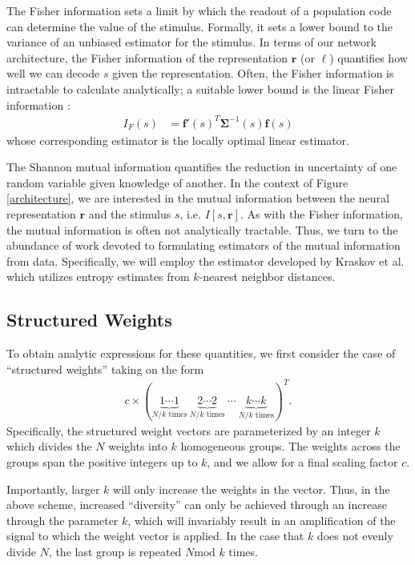 \documentclass[12pt]{article}
\begin{document}
The Fisher information sets a limit by which the readout of a population code can determine the value of the stimulus. Formally, it sets a lower bound to the variance of an unbiased estimator for the stimulus. In terms of our network architecture, the Fisher information of the representation $\mathbf{r}$ (or $\boldsymbol{\ell}$) quantifies how well we can decode $s$ given the representation. Often, the Fisher information is intractable to calculate analytically; a suitable lower bound is the linear Fisher information \citep{kohn2016}:
\begin{align}
I_F(s) &= \mathbf{f}'(s)^T \boldsymbol{\Sigma}^{-1}(s) \mathbf{f}(s)
\end{align}
whose corresponding estimator is the locally optimal linear estimator. 

The Shannon mutual information quantifies the reduction in uncertainty of one random variable given knowledge of another. In the context of Figure \ref{architecture}, we are interested in the mutual information between the neural representation $\mathbf{r}$ and the stimulus $s$, i.e. $I[s, \mathbf{r}]$. As with the Fisher information, the mutual information is often not analytically tractable. Thus, we turn to the abundance of work devoted to formulating estimators of the mutual information from data. Specifically, we will employ the estimator developed by Kraskov et al. which utilizes entropy estimates from $k$-nearest neighbor distances.
\subsection{Structured Weights}
To obtain analytic expressions for these quantities, we first consider the case of ``structured weights'' taking on the form
\begin{align}
c \times \left(\underbrace{1 \cdots 1}_{N/k \text{ times}}  \ \underbrace{2 \cdots 2}_{N/k \text{ times}} \ \cdots \ \underbrace{k \cdots k}_{N/k \text{ times}}   \right)^T.
\end{align}
Specifically, the structured weight vectors are parameterized by an integer $k$ which divides the $N$ weights into $k$ homogeneous groups. The weights across the groups span the positive integers up to $k$, and we allow for a final scaling factor $c$. 

Importantly,  larger $k$ will only increase the weights in the vector. Thus, in the above scheme, increased ``diversity'' can only be achieved through an increase through the parameter $k$, which will invariably result in an amplification of the signal to which the weight vector is applied. In the case that $k$ does not evenly divide $N$, the last group is repeated $N\text{mod }k$ times.
\end{document}
